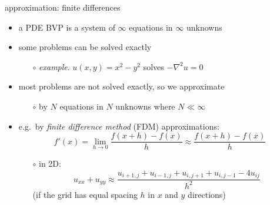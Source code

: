 \documentclass[hide notes,intlimits,usenames,dvipsnames]{beamer}
\newcommand{\grad}{\nabla}
\begin{document}
\begin{frame}{approximation: finite differences}
\begin{itemize}
\item a PDE BVP is a system of $\infty$ equations in $\infty$ unknowns
\item some problems can be solved exactly
	\begin{itemize}
	\item[$\circ$] \emph{example}.  $u(x,y)=x^2-y^2$ solves $-\grad^2 u = 0$
	\end{itemize}
\item most problems are not solved exactly, so we approximate
	\begin{itemize}
	\item[$\circ$] by $N$ equations in $N$ unknowns where $N \ll \infty$
	\end{itemize}
\item e.g.~by \emph{finite difference method} (FDM) approximations:
	    $$f'(x) = \lim_{h \to 0} \frac{f(x+h)-f(x)}{h} \approx \frac{f(x+h)-f(x)}{h}$$
	\begin{itemize}
    \vspace{-5mm}
	\item[$\circ$] in 2D:
	    $$u_{xx}+u_{yy} \approx \frac{u_{i+1,j} + u_{i-1,j} + u_{i,j+1} + u_{i,j-1} - 4 u_{ij}}{h^2}$$
	(if the grid has equal spacing $h$ in $x$ and $y$ directions)
	\end{itemize}
\end{itemize}
\end{frame}
\end{document}
